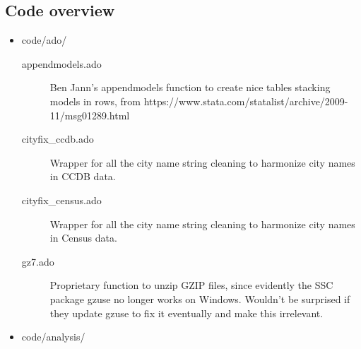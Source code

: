 \documentclass{article}
\begin{document}
\subsection{Code overview}
\begin{itemize}
	\item code/ado/

		\begin{description}
		\item[appendmodels.ado] Ben Jann's appendmodels function to create nice tables stacking models in rows, from https://www.stata.com/statalist/archive/2009-11/msg01289.html
		\item[cityfix\_ccdb.ado] Wrapper for all the city name string cleaning to harmonize city names in CCDB data.
		\item[cityfix\_census.ado] Wrapper for all the city name string cleaning to harmonize city names in Census data.
		\item[gz7.ado] Proprietary function to unzip GZIP files, since evidently the SSC package gzuse no longer works on Windows. Wouldn't be surprised if they update gzuse to fix it eventually and make this irrelevant.
		\end{description}

	\item code/analysis/


\end{itemize}
\end{document}
